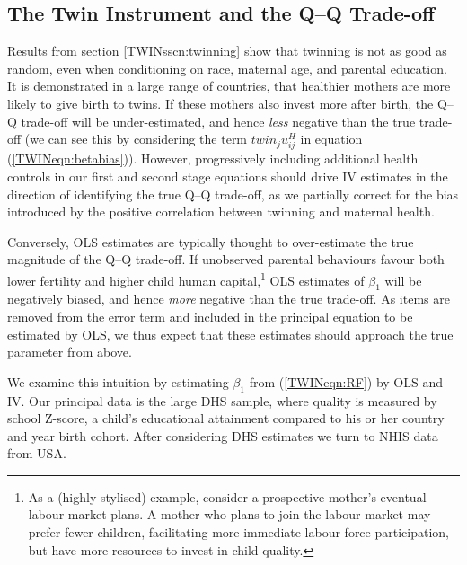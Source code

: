 \subsection{The Twin Instrument and the Q--Q Trade-off} \label{TWINsscn:QQtwins}
Results from section \ref{TWINsscn:twinning} show that twinning is not as good
as random, even when conditioning on race, maternal age, and parental education. 
It is demonstrated in a large range of countries, that healthier mothers are 
more likely to give birth to twins. If these mothers also invest more after 
birth, the Q--Q trade-off will be under-estimated, and hence \emph{less} 
negative than the true trade-off (we can see this by considering the term 
$twin_ju^H_{ij}$ in equation (\ref{TWINeqn:betabias})). However, progressively 
including additional health controls in our first and second stage equations 
should drive IV estimates in the direction of identifying the true Q--Q 
trade-off, as we partially correct for the bias introduced by the positive 
correlation between twinning and maternal health.

Conversely, OLS estimates are typically thought to over-estimate the true 
magnitude of the Q--Q trade-off.  If unobserved parental behaviours favour both
lower fertility and higher child human capital,\footnote{As a (highly stylised) 
example, consider a prospective mother's eventual labour market plans. A mother 
who plans to join the labour market may prefer fewer children, facilitating more 
immediate labour force participation, but have more resources to invest in child
quality.} OLS estimates of $\beta_1$ will be negatively biased, and hence 
\emph{more} negative than the true trade-off.  As items are removed from the
error term and included in the principal equation to be estimated by OLS, we thus 
expect that these estimates should approach the true parameter from above.

We examine this intuition by estimating $\beta_1$ from (\ref{TWINeqn:RF}) by OLS 
and IV. Our principal data is the large DHS sample, where quality is measured by
school Z-score, a child's educational attainment compared to his or her 
country and year birth cohort.  After considering DHS estimates we turn to 
NHIS data from USA.

